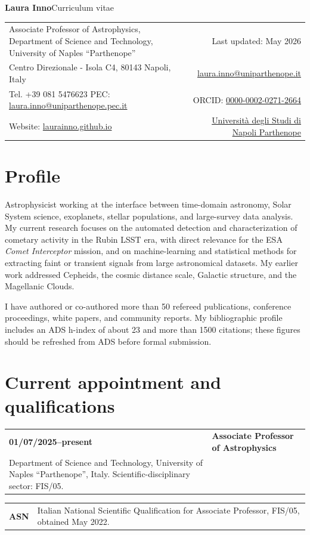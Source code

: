 \documentclass[11pt,a4paper]{article}
\makeatletter
\newcommand{\cvitem}[2]{\begin{tabularx}{\textwidth}{@{}p{3.1cm}X@{}}\textbf{#1} & #2 \\ \end{tabularx}}
\newcommand{\role}[3]{\cvitem{#1}{\textbf{#2}\\#3}}
\newcommand{\subrole}[2]{\cvitem{#1}{#2}}
\makeatother
\begin{document}
{\Huge\bfseries Laura Inno}\hfill {\large\color{accent}Curriculum vitae}\par
\vspace{0.45em}
\begin{tabularx}{\textwidth}{@{}X r@{}}
Associate Professor of Astrophysics, Department of Science and Technology, University of Naples ``Parthenope'' & Last updated: May 2026\\
Centro Direzionale - Isola C4, 80143 Napoli, Italy & \href{mailto:laura.inno@uniparthenope.it}{laura.inno@uniparthenope.it}\\
Tel. +39 081 5476623 \quad PEC: \href{mailto:laura.inno@uniparthenope.pec.it}{laura.inno@uniparthenope.pec.it} & ORCID: \href{https://orcid.org/0000-0002-0271-2664}{0000-0002-0271-2664}\\
Website: \href{https://laurainno.github.io}{laurainno.github.io} & \href{https://www.uniparthenope.it}{Universit\`a degli Studi di Napoli Parthenope}
\end{tabularx}

\section*{Profile}
Astrophysicist working at the interface between time-domain astronomy, Solar System science, exoplanets, stellar populations, and large-survey data analysis. My current research focuses on the automated detection and characterization of cometary activity in the Rubin LSST era, with direct relevance for the ESA \textit{Comet Interceptor} mission, and on machine-learning and statistical methods for extracting faint or transient signals from large astronomical datasets. My earlier work addressed Cepheids, the cosmic distance scale, Galactic structure, and the Magellanic Clouds.

I have authored or co-authored more than 50 refereed publications, conference proceedings, white papers, and community reports. My bibliographic profile includes an ADS h-index of about 23 and more than 1500 citations; these figures should be refreshed from ADS before formal submission.

\section*{Current appointment and qualifications}
\role{01/07/2025--present}{Associate Professor of Astrophysics}{Department of Science and Technology, University of Naples ``Parthenope'', Italy. Scientific-disciplinary sector: FIS/05.}
\subrole{ASN}{Italian National Scientific Qualification for Associate Professor, FIS/05, obtained May 2022.}
\end{document}
